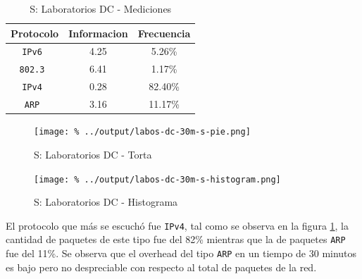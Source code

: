 \documentclass[final,inline,a4paper,narroweqnarray]{ieee}
\begin{document}
    \begin{table}[ht]\begin{center}
      \begin{tabular}{|c|c|c|}
      \hline
      \textbf{Protocolo} & \textbf{Informacion} & \textbf{Frecuencia} \\ \hline
      \texttt{IPv6      }& 4.25        & 5.26\%     \\ \hline
      \texttt{802.3     }& 6.41        & 1.17\%     \\ \hline
      \texttt{IPv4      }& 0.28        & 82.40\%    \\ \hline
      \texttt{ARP       }& 3.16        & 11.17\%    \\ \hline
      \end{tabular}
      \label{labos-dc-s-table}
      \caption{S: Laboratorios DC - Mediciones}
    \end{center}\end{table}

    \begin{figure}[ht]\begin{center}
      \texttt{[image: \%
      ../output/labos-dc-30m-s-pie.png]}
      \vspace{-3em}
      \caption{S: Laboratorios DC - Torta}
      \label{labos-dc-30m-s-pie}
    \end{center}\end{figure}

    \begin{figure}[ht]\begin{center}
      \texttt{[image: \%
      ../output/labos-dc-30m-s-histogram.png]}
      \caption{S: Laboratorios DC - Histograma}
      \label{labos-dc-30m-s-histogram}
    \end{center}\end{figure}


  El protocolo que más se escuchó fue \texttt{IPv4}, tal como se
  observa en la figura \ref{labos-dc-30m-s-pie}, la cantidad de
  paquetes  de este tipo fue del 82\% mientras que la de paquetes
  \texttt{ARP} fue del 11\%. Se observa que el overhead del tipo \texttt{ARP} 
  en un tiempo de 30 minutos es bajo pero no despreciable con respecto al 
  total de paquetes de la red.
\end{document}
